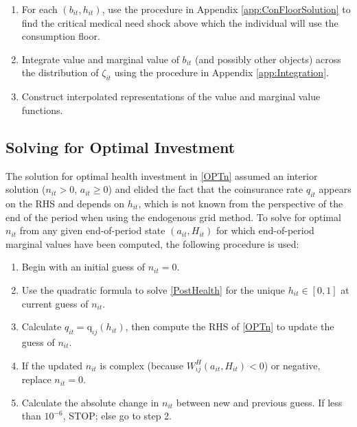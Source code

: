 \documentclass[12pt,pdftex,letterpaper]{article}
\newcommand{\Type}{\iota}
\newcommand{\Health}{h}
\newcommand{\PostHealth}{H}
\newcommand{\PostValue}{W}
\newcommand{\Invst}{n}
\newcommand{\Bank}{b}
\newcommand{\Assets}{a}
\newcommand{\Copay}{q}
\newcommand{\CopayFunc}{\text{\Copay}}
\newcommand{\Age}{j}
\begin{document}
\begin{enumerate}
\item For each $(\Bank_{it},\Health_{it})$, use the procedure in Appendix \ref{app:ConFloorSolution} to find the critical medical need shock above which the individual will use the consumption floor.

\item Integrate value and marginal value of $\Bank_{it}$ (and possibly other objects) across the distribution of $\zeta_{it}$ using the procedure in Appendix \ref{app:Integration}.

\item Construct interpolated representations of the value and marginal value functions.
\end{enumerate}


\subsection{Solving for Optimal Investment}
\label{app:OPTn}

The solution for optimal health investment in \eqref{OPTn} assumed an interior solution ($\Invst_{it} > 0$, $\Assets_{it} \geq 0$) and elided the fact that the coinsurance rate $\Copay_{it}$ appears on the RHS and depends on $\Health_{it}$, which is not known from the perspective of the end of the period when using the endogenous grid method.  To solve for optimal $\Invst_{it}$ from any given end-of-period state $(\Assets_{it},\PostHealth_{it})$ for which end-of-period marginal values have been computed, the following procedure is used:
\begin{enumerate}
\item Begin with an initial guess of $\Invst_{it}=0$.

\item Use the quadratic formula to solve \eqref{PostHealth} for the unique $\Health_{it} \in [0,1]$ at current guess of $\Invst_{it}$.

\item Calculate $\Copay_{it} = \CopayFunc_{\Type \Age}(\Health_{it})$, then compute the RHS of \eqref{OPTn} to update the guess of $\Invst_{it}$.

\item If the updated $\Invst_{it}$ is complex (because $\PostValue^\PostHealth_{\Type \Age}(\Assets_{it},\PostHealth_{it}) < 0$) or negative, replace $\Invst_{it} = 0$.

\item Calculate the absolute change in $\Invst_{it}$ between new and previous guess.  If less than $10^{-6}$, STOP; else go to step 2.
\end{enumerate}
\end{document}
